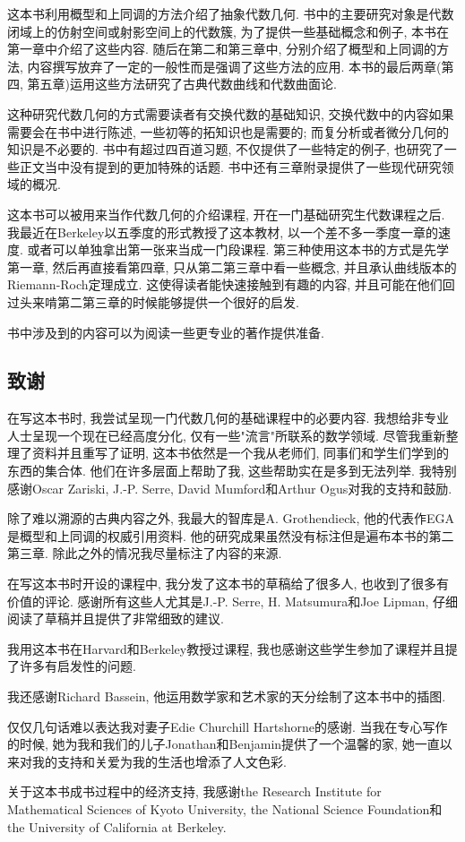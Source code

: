 这本书利用概型和上同调的方法介绍了抽象代数几何. 书中的主要研究对象是代数闭域上的仿射空间或射影空间上的代数簇, 为了提供一些基础概念和例子, 本书在第一章中介绍了这些内容. 随后在第二和第三章中, 分别介绍了概型和上同调的方法, 内容撰写放弃了一定的一般性而是强调了这些方法的应用. 本书的最后两章(第四, 第五章)运用这些方法研究了古典代数曲线和代数曲面论.

这种研究代数几何的方式需要读者有交换代数的基础知识, 交换代数中的内容如果需要会在书中进行陈述, 一些初等的拓知识也是需要的; 而复分析或者微分几何的知识是不必要的. 书中有超过四百道习题, 不仅提供了一些特定的例子, 也研究了一些正文当中没有提到的更加特殊的话题. 书中还有三章附录提供了一些现代研究领域的概况.

这本书可以被用来当作代数几何的介绍课程, 开在一门基础研究生代数课程之后. 我最近在Berkeley以五季度的形式教授了这本教材, 以一个差不多一季度一章的速度. 或者可以单独拿出第一张来当成一门段课程. 第三种使用这本书的方式是先学第一章, 然后再直接看第四章, 只从第二第三章中看一些概念, 并且承认曲线版本的Riemann-Roch定理成立. 这使得读者能快速接触到有趣的内容, 并且可能在他们回过头来啃第二第三章的时候能够提供一个很好的启发.

书中涉及到的内容可以为阅读一些更专业的著作提供准备.

\subsection*{致谢}

在写这本书时, 我尝试呈现一门代数几何的基础课程中的必要内容. 我想给非专业人士呈现一个现在已经高度分化, 仅有一些"流言"所联系的数学领域. 尽管我重新整理了资料并且重写了证明, 这本书依然是一个我从老师们, 同事们和学生们学到的东西的集合体. 他们在许多层面上帮助了我, 这些帮助实在是多到无法列举. 我特别感谢Oscar Zariski, J.-P. Serre, David Mumford和Arthur Ogus对我的支持和鼓励.

除了难以溯源的古典内容之外, 我最大的智库是A. Grothendieck, 他的代表作EGA是概型和上同调的权威引用资料. 他的研究成果虽然没有标注但是遍布本书的第二第三章. 除此之外的情况我尽量标注了内容的来源.

在写这本书时开设的课程中, 我分发了这本书的草稿给了很多人, 也收到了很多有价值的评论. 感谢所有这些人尤其是J.-P. Serre, H. Matsumura和Joe Lipman, 仔细阅读了草稿并且提供了非常细致的建议.

我用这本书在Harvard和Berkeley教授过课程, 我也感谢这些学生参加了课程并且提了许多有启发性的问题.

我还感谢Richard Bassein, 他运用数学家和艺术家的天分绘制了这本书中的插图.

仅仅几句话难以表达我对妻子Edie Churchill Hartshorne的感谢. 当我在专心写作的时候, 她为我和我们的儿子Jonathan和Benjamin提供了一个温馨的家, 她一直以来对我的支持和关爱为我的生活也增添了人文色彩.

关于这本书成书过程中的经济支持, 我感谢the Research Institute for Mathematical Sciences of Kyoto University, the National Science Foundation和the University of California at Berkeley.
